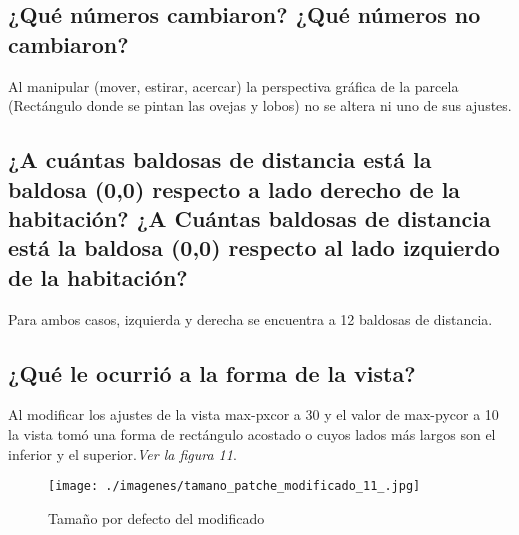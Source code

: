 \documentclass[12pt,letterpaper]{article}
\begin{document}
\subsection{¿Qué números cambiaron? ¿Qué números no cambiaron?}

Al manipular (mover, estirar, acercar)  la perspectiva gráfica de la parcela (Rectángulo donde se pintan las ovejas y lobos) no se altera ni uno de sus ajustes.
\vspace{1cm}
\subsection{¿A cuántas baldosas de distancia está la baldosa (0,0) respecto a lado derecho de la habitación? ¿A Cuántas baldosas de distancia está la baldosa (0,0) respecto al lado izquierdo de la habitación?}

Para ambos casos, izquierda y derecha se encuentra a 12 baldosas de distancia.
\vspace{1cm}

\subsection{¿Qué le ocurrió a la forma de la vista?}

Al modificar los ajustes de la vista max-pxcor a 30 y el valor de max-pycor a 10 la vista tomó una forma de rectángulo acostado o cuyos lados más largos son el inferior y el superior.\textit{Ver la figura 11}.

\begin{figure}[h!]
\begin{floatrow}
\centering
\caption{Tamaño por defecto del modificado}
\texttt{[image: ./imagenes/tamano\_patche\_modificado\_11\_.jpg]}
\label{fig: Tamaño modificado del patche.}
\end{floatrow}
\end{figure}
\end{document}
